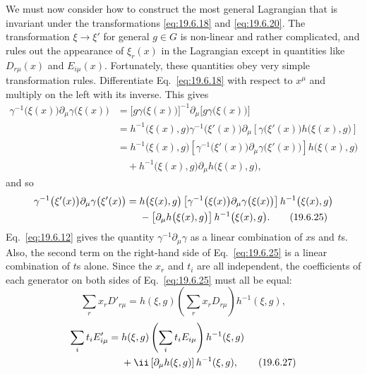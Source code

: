 We must now consider how to construct the most general Lagrangian that is invariant under the transformations \eqref{eq:19.6.18} and \eqref{eq:19.6.20}. The transformation $\xi\to\xi'$ for general $g\in G$ is non-linear and rather complicated, and rules out the appearance of $\xi_r(x)$ in the Lagrangian except in quantities like $D_{r\mu}(x)$ and $E_{i\mu}(x)$. Fortunately, these quantities obey very simple transformation rules. Differentiate Eq.~\eqref{eq:19.6.18} with respect to $x^\mu$ and multiply on the left with its inverse. This gives
\[
\begin{aligned}
\gamma^{-1}\bigl(\xi(x)\bigr)\partial_\mu\gamma\bigl(\xi(x)\bigr)
&=\bigl[g\gamma\bigl(\xi(x)\bigr)\bigr]^{-1}
\partial_\mu\bigl[g\gamma\bigl(\xi(x)\bigr)\bigr]
\\
&=h^{-1}\bigl(\xi(x),g\bigr)
\gamma^{-1}\bigl(\xi'(x)\bigr)
\partial_\mu\left[
\gamma\bigl(\xi'(x)\bigr)h\bigl(\xi(x),g\bigr)\right]
\\
&=h^{-1}\bigl(\xi(x),g\bigr)
\left[
\gamma^{-1}\bigl(\xi'(x)\bigr)
\partial_\mu\gamma\bigl(\xi'(x)\bigr)\right]
h\bigl(\xi(x),g\bigr)
\\
&\quad
+h^{-1}\bigl(\xi(x),g\bigr)
\partial_\mu h\bigl(\xi(x),g\bigr),
\end{aligned}
\]
and so
\begin{align}
\gamma^{-1}\bigl(\xi'(x)\bigr)
\partial_\mu\gamma\bigl(\xi'(x)\bigr)
={}&h\bigl(\xi(x),g\bigr)
\left[
\gamma^{-1}\bigl(\xi(x)\bigr)
\partial_\mu\gamma\bigl(\xi(x)\bigr)\right]
h^{-1}\bigl(\xi(x),g\bigr)
\notag\\
&-\left[
\partial_\mu h\bigl(\xi(x),g\bigr)\right]
h^{-1}\bigl(\xi(x),g\bigr).
\tag{19.6.25}\label{eq:19.6.25}
\end{align}
Eq.~\eqref{eq:19.6.12} gives the quantity $\gamma^{-1}\partial_\mu\gamma$ as a linear combination of $x$s and $t$s. Also, the second term on the right-hand side of Eq.~\eqref{eq:19.6.25} is a linear combination of $t$s alone. Since the $x_r$ and $t_i$ are all independent, the coefficients of each generator on both sides of Eq.~\eqref{eq:19.6.25} must all be equal:
\begin{equation}
\sum_r x_rD'_{r\mu}
=h(\xi,g)\left(\sum_r x_rD_{r\mu}\right)h^{-1}(\xi,g),
\tag{19.6.26}\label{eq:19.6.26}
\end{equation}
\begin{align}
\sum_i t_iE'_{i\mu}
={}&h(\xi,g)\left(\sum_i t_iE_{i\mu}\right)h^{-1}(\xi,g)
\notag\\
&+\ii\left[\partial_\mu h(\xi,g)\right]h^{-1}(\xi,g),
\tag{19.6.27}\label{eq:19.6.27}
\end{align}
